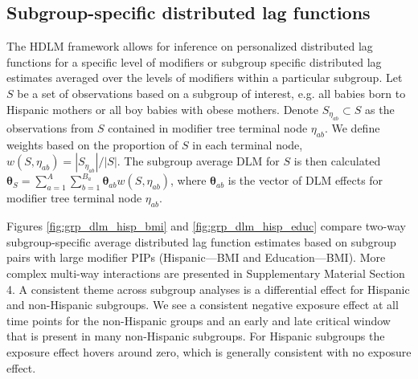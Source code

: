 \documentclass[12pt]{article}
\begin{document}
\subsection{Subgroup-specific distributed lag functions}
\label{sec:subgroup-analysis}
The HDLM framework allows for inference on personalized distributed lag functions for a specific level of modifiers or subgroup specific distributed lag estimates averaged over the levels of modifiers within a particular subgroup. Let $S$ be a set of observations based on a subgroup of interest, e.g. all babies born to Hispanic mothers or all boy babies with obese mothers. Denote $S_{\eta_{ab}}\subset S$ as the observations from $S$ contained in modifier tree terminal node $\eta_{ab}$. We define weights based on the proportion of $S$ in each terminal node, $w(S,\eta_{ab})=|S_{\eta_{ab}}|\big/|S|$. The subgroup average DLM for $S$ is then calculated $\boldsymbol\theta_S=\sum_{a=1}^A\sum_{b=1}^{B_a}\boldsymbol\theta_{ab}w(S,\eta_{ab})$, where $\boldsymbol\theta_{ab}$ is the vector of DLM effects for modifier tree terminal node $\eta_{ab}$.

Figures \ref{fig:grp_dlm_hisp_bmi} and \ref{fig:grp_dlm_hisp_educ} compare two-way subgroup-specific average distributed lag function estimates based on subgroup pairs with large modifier PIPs (Hispanic---BMI and Education---BMI). More complex multi-way interactions are presented in Supplementary Material Section 4. A consistent theme across subgroup analyses is a differential effect for Hispanic and non-Hispanic subgroups. We see a consistent negative exposure effect at all time points for the non-Hispanic groups and an early and late critical window that is present in many non-Hispanic subgroups. For Hispanic subgroups the exposure effect hovers around zero, which is generally consistent with no exposure effect. 
\end{document}
